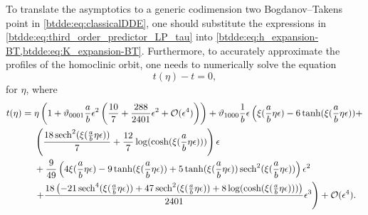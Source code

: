 To translate the asymptotics to a generic codimension two Bogdanov--Takens point
in \cref{btdde:eq:classicalDDE}, one should substitute the expressions in
\cref{btdde:eq:third_order_predictor_LP_tau} into \cref{btdde:eq:h_expansion-BT,btdde:eq:K_expansion-BT}.
Furthermore, to accurately approximate the profiles of the homoclinic orbit, one needs to numerically solve
the equation 
\begin{equation*}
    t(\eta) - t = 0,
\end{equation*}
for $\eta$, where
\begin{equation*}
\label{btdde:eq:tOfTau}
\begin{aligned}
    t(\eta) ={}& \eta \left( 1 + \vartheta_{0001}\frac{a}{b}\epsilon^2\left(\frac{10}{7}+ \frac{288}{2401} \epsilon^2 + \mathcal{O}(\epsilon^4) \right) \right) + 
				 \vartheta_{1000} \frac1{b} \epsilon \left( \xi(\frac{a}{b}\eta\epsilon) -6 \tanh (\xi(\frac{a}{b}\eta\epsilon) ) + \right. \\
               &\left( \frac{18 \operatorname{sech}^2(\xi(\frac{a}{b}\eta\epsilon) )}{7}+\frac{12}{7} \log (\cosh (\xi(\frac{a}{b}\eta\epsilon) )) \right) \epsilon \\ 
               & +\frac{9}{49} \left(4 \xi(\frac{a}{b}\eta\epsilon) -9 \tanh (\xi(\frac{a}{b}\eta\epsilon) )+5 \tanh (\xi(\frac{a}{b}\eta\epsilon) ) \operatorname{sech}^2(\xi(\frac{a}{b}\eta\epsilon))\right) \epsilon^2 \\ 
               & \left. +\frac{18 \left(-21 \operatorname{sech}^4(\xi(\frac{a}{b}\eta\epsilon) )+47 \operatorname{sech}^2(\xi(\frac{a}{b}\eta\epsilon) )+8 \log (\cosh (\xi(\frac{a}{b}\eta\epsilon) ))\right)}{2401} \epsilon^3 \right) + \mathcal{O}(\epsilon^4).
\end{aligned}
\end{equation*}

